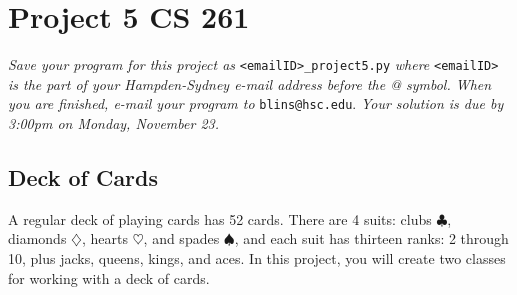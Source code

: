 \documentclass[12pt]{article}
\begin{document}
\section*{Project 5 \hfill CS 261}

\textit{Save your program for this project as} \verb|<emailID>_project5.py| \textit{where} \verb|<emailID>| \textit{is the part of your Hampden-Sydney e-mail address before the @ symbol. When you are finished, e-mail your program to} \verb|blins@hsc.edu|. \textit{Your solution is due by 3:00pm on Monday, November 23. }

\subsection*{Deck of Cards}

A regular deck of playing cards has 52 cards.  There are 4 suits: clubs $\clubsuit$, diamonds $\diamondsuit$, hearts $\heartsuit$, and spades $\spadesuit$, and each suit has thirteen ranks: 2 through 10, plus jacks, queens, kings, and aces.  In this project, you will create two classes for working with a deck of cards.  
\end{document}
